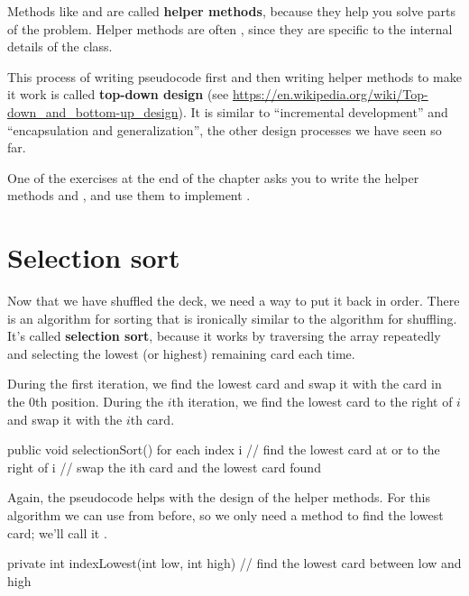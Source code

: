 
Methods like  and  are called {\bf helper methods}, because they help you solve parts of the problem.
Helper methods are often , since they are specific to the internal details of the class.


This process of writing pseudocode first and then writing helper methods to make it work is called {\bf top-down design} (see \url{https://en.wikipedia.org/wiki/Top-down_and_bottom-up_design}).
It is similar to ``incremental development'' and ``encapsulation and generalization'', the other design processes we have seen so far.

One of the exercises at the end of the chapter asks you to write the helper methods  and , and use them to implement .


\section{Selection sort}
\label{sorting}


Now that we have shuffled the deck, we need a way to put it back in order.
There is an algorithm for sorting that is ironically similar to the algorithm for shuffling.
It's called {\bf selection sort}, because it works by traversing the array repeatedly and selecting the lowest (or highest) remaining card each time.

During the first iteration, we find the lowest card and swap it with the card in the 0th position.
During the $i$th iteration, we find the lowest card to the right of $i$ and swap it with the $i$th card.

\begin{code}
public void selectionSort() {
    for each index i {
        // find the lowest card at or to the right of i
        // swap the ith card and the lowest card found
    }
}
\end{code}

Again, the pseudocode helps with the design of the helper methods.
For this algorithm we can use  from before, so we only need a method to find the lowest card; we'll call it .

\begin{code}
private int indexLowest(int low, int high) {
    // find the lowest card between low and high
}
\end{code}


